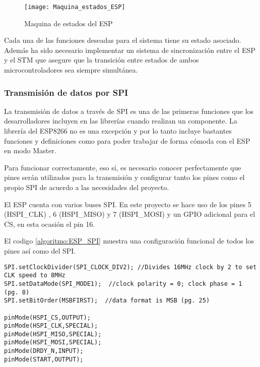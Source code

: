 \begin{figure} [h]
    \centering
    \texttt{[image: Maquina\_estados\_ESP]}
    \caption{Maquina de estados del ESP}
    \label{fig:Maquina_estados_ESP}
\end{figure}

Cada una de las funciones deseadas para el sistema tiene su estado asociado. Además ha sido necesario implementar un sistema de sincronización entre el ESP y el STM que asegure que la transición entre estados de ambos microcontroladores sea siempre simultánea.

\clearpage

\subsubsection{Transmisión de datos por SPI\label{sec:Software_Arduino_Com}}

La transmisión de datos a través de SPI es una de las primeras funciones que los desarrolladores incluyen en las librerías cuando realizan un componente. La librería del ESP8266 no es una excepción y por lo tanto incluye bastantes funciones y definiciones como para poder trabajar de forma cómoda con el ESP en modo Master.

Para funcionar correctamente, eso sí, es necesario conocer perfectamente que pines serán utilizados para la transmisión y configurar tanto los pines como el propio SPI de acuerdo a las necesidades del proyecto.

El ESP cuenta con varios buses SPI. En este proyecto se hace uso de los pines 5 (HSPI\_CLK) , 6 (HSPI\_MISO) y 7 (HSPI\_MOSI) y un GPIO adicional para el $\overline{\text{CS}}$, en esta ocasión el pin 16.

El codigo \ref{algoritmo:ESP_SPI} muestra una configuración funcional de todos los pines así como del SPI.

\begin{lstlisting}[label=algoritmo:ESP_SPI,style = STM-code,frame=single,caption=Configuración de pines para el uso de \acrshort{SPI}]
SPI.setClockDivider(SPI_CLOCK_DIV2); //Divides 16MHz clock by 2 to set CLK speed to 8MHz
SPI.setDataMode(SPI_MODE1);  //clock polarity = 0; clock phase = 1 (pg. 8)
SPI.setBitOrder(MSBFIRST);  //data format is MSB (pg. 25)  
  
pinMode(HSPI_CS,OUTPUT);
pinMode(HSPI_CLK,SPECIAL);
pinMode(HSPI_MISO,SPECIAL);
pinMode(HSPI_MOSI,SPECIAL);
pinMode(DRDY_N,INPUT);
pinMode(START,OUTPUT);
\end{lstlisting}

